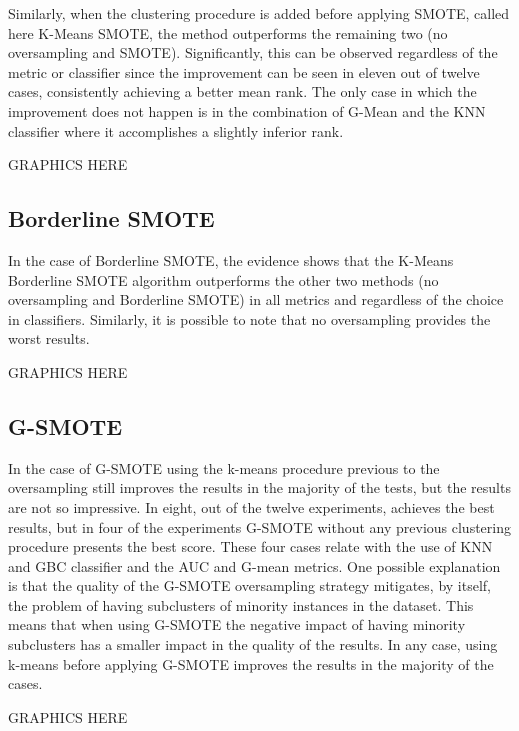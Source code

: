 \documentclass[parskip=full]{scrartcl}
\begin{document}
Similarly, when the clustering procedure is added before applying SMOTE, called 
here K-Means SMOTE, the method outperforms the remaining two (no oversampling 
and SMOTE). Significantly, this can be observed regardless of the metric or 
classifier since the improvement can be seen in eleven out of twelve cases, 
consistently achieving a better mean rank. The only case in which the 
improvement does not happen is in the combination of G-Mean and the KNN 
classifier where it accomplishes a slightly inferior rank. 

GRAPHICS HERE

\subsection{Borderline SMOTE}

In the case of Borderline SMOTE, the evidence shows that the K-Means Borderline 
SMOTE algorithm outperforms the other two methods (no oversampling and 
Borderline SMOTE) in all metrics and regardless of the choice in classifiers. 
Similarly, it is possible to note that no oversampling provides the worst 
results.

GRAPHICS HERE

\subsection{G-SMOTE}

In the case of G-SMOTE using the k-means procedure previous to the oversampling 
still improves the results in the majority of the tests, but the results are 
not so impressive. In eight, out of the twelve experiments, achieves the best 
results, but in four of the experiments G-SMOTE without any previous clustering 
procedure presents the best score. These four cases relate with the use of KNN 
and GBC classifier and the AUC and G-mean metrics. One possible explanation is 
that the quality of the G-SMOTE oversampling strategy mitigates, by itself, the 
problem of having subclusters of minority instances in the dataset. This means 
that when using G-SMOTE the negative impact of having minority subclusters has 
a smaller impact in the quality of the results. In any case, using k-means 
before applying G-SMOTE improves the results in the majority of the cases.

GRAPHICS HERE
\end{document}
